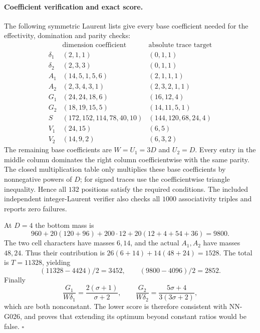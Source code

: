 \paragraph{Coefficient verification and exact score.}
The following symmetric Laurent lists give every base
coefficient needed for the effectivity, domination and
parity checks:
\[
\begin{array}{c|l|l}
 &\text{dimension coefficient}&\text{absolute trace target}\\\hline
 \delta_1&(2,1,1)&(0,1,1)\\
 \delta_2&(2,3,3)&(0,1,1)\\
 A_1&(14,5,1,5,6)&(2,1,1,1)\\
 A_2&(2,3,4,3,1)&(2,3,2,1,1)\\
 G_1&(24,24,18,6)&(16,12,4)\\
 G_2&(18,19,15,5)&(14,11,5,1)\\
 S&(172,152,114,78,40,10)&(144,120,68,24,4)\\
 V_1&(24,15)&(6,5)\\
 V_2&(14,9,2)&(6,3,2)
\end{array}                                                         \tag{G027.2}
\]
The remaining base coefficients are $W=U_1=3D$ and
$U_2=D$. Every entry in the middle column dominates
the right column coefficientwise with the same parity.
The closed multiplication table only multiplies these
base coefficients by nonnegative powers of $D$;
for signed traces use the coefficientwise triangle
inequality. Hence all $132$ positions satisfy the
required conditions. The included independent
integer-Laurent verifier also checks all $1000$
associativity triples and reports zero failures.

At $D=4$ the bottom mass is
\[
 960+20(120+96)+200\cdot12+20(12+4+54+36)=9800.
\]
The two cell characters have masses $6,14$, and the
actual $A_1,A_2$ have masses $48,24$. Thus their
contribution is $26(6+14)+14(48+24)=1528$.
The total is $T=11328$, yielding
\[
 (11328-4424)/2=3452,\qquad (9800-4096)/2=2852.
 \tag{G027.3}
\]
Finally
\[
 \frac{G_1}{W\delta_1}=\frac{2(\sigma+1)}{\sigma+2},
 \qquad
 \frac{G_2}{W\delta_2}=\frac{5\sigma+4}{3(3\sigma+2)},
\]
which are both nonconstant. The lower score is therefore
consistent with NN-G026, and proves that extending
its optimum beyond constant ratios would be false.
\hfill$\square$

